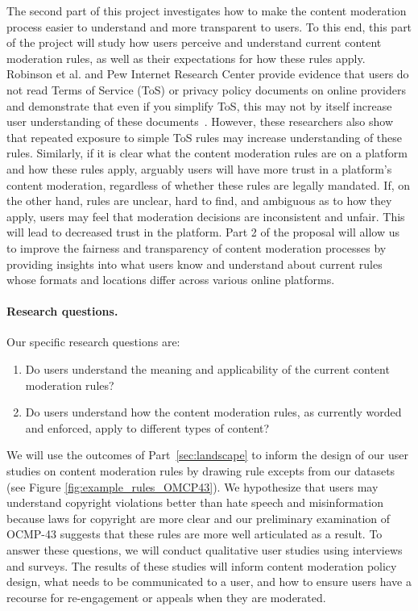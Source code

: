 The second part of this project investigates how to make the content
moderation process easier to understand and more transparent to users. To this
end, this part of the project will study
how users perceive and understand current content moderation rules, as well as
their expectations for how these rules apply. Robinson et al. and Pew Internet
Research Center provide evidence that users do not read Terms of Service (ToS) or
privacy policy documents on online providers and demonstrate that even if you
simplify ToS, this may not by itself increase user understanding of these
documents~\cite{Robinson_Beyond_Agree_2020, PewPrivacyPolicyToS2019}. However,
these researchers also show that repeated exposure to simple ToS rules may
increase understanding of these rules. Similarly, if it is clear what
the content moderation rules are on a platform and how these rules apply,
arguably users will have more trust in a platform's content moderation,
regardless of whether these rules are legally mandated. If, on the other
hand, rules are unclear, hard to find, and ambiguous as to how they apply,
users may feel that moderation decisions are inconsistent and unfair. This
will lead to decreased trust in the platform. Part 2 of the proposal will
allow us to improve the fairness and transparency of content moderation
processes by providing insights into what users know and understand about
current rules whose formats and locations differ across various online
platforms. 

\paragraph{Research questions.}
Our specific research questions are:
\begin{enumerate}
    \item Do users understand the meaning and applicability of the current content moderation rules?
    \item Do users understand how the content moderation rules, as currently worded and enforced, apply to different types of content? 
\end{enumerate}
 
We will use the outcomes of Part~\ref{sec:landscape} to inform the design of our user studies on
content moderation rules by drawing rule excepts from our datasets (see Figure \ref{fig:example_rules_OMCP43}).
We hypothesize that
users may understand copyright violations better than hate
speech and misinformation because laws for copyright are more
clear and our preliminary examination of OCMP-43 suggests that these rules are more well articulated as a result. To answer these questions, we will conduct qualitative user studies using interviews and surveys. The results of these studies will inform content moderation
policy design, what needs to be communicated to a user, and how to ensure
users have a recourse for re-engagement or appeals when they are moderated. 


